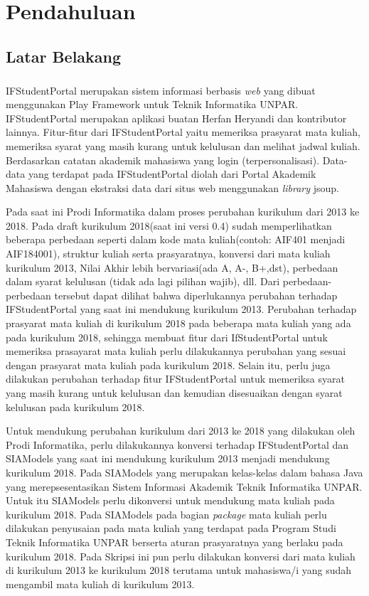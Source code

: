 \chapter{Pendahuluan}
\label{chap:intro}
   
\section{Latar Belakang}
\label{sec:label}

\paragraph{} IFStudentPortal merupakan sistem informasi berbasis  \textit{web} yang dibuat menggunakan Play Framework untuk Teknik Informatika UNPAR. IFStudentPortal merupakan aplikasi buatan Herfan Heryandi dan kontributor lainnya. Fitur-fitur dari IFStudentPortal yaitu memeriksa prasyarat mata kuliah, memeriksa syarat yang masih kurang untuk kelulusan dan melihat jadwal kuliah. Berdasarkan catatan akademik mahasiswa yang login (terpersonalisasi). Data-data yang terdapat pada IFStudentPortal diolah dari Portal Akademik Mahasiswa dengan ekstraksi data dari situs web menggunakan \textit{library} jsoup.

Pada saat ini Prodi Informatika dalam proses perubahan kurikulum dari 2013 ke 2018. Pada draft kurikulum 2018(saat ini versi 0.4) sudah memperlihatkan beberapa perbedaan seperti dalam kode mata kuliah(contoh: AIF401 menjadi AIF184001), struktur kuliah serta prasyaratnya, konversi dari mata kuliah kurikulum 2013, Nilai Akhir lebih bervariasi(ada A, A-, B+,dst), perbedaan dalam syarat kelulusan (tidak ada lagi pilihan wajib), dll. Dari perbedaan-perbedaan tersebut dapat dilihat bahwa diperlukannya perubahan terhadap IFStudentPortal yang saat ini mendukung kurikulum 2013. Perubahan terhadap prasyarat mata kuliah di kurikulum 2018 pada beberapa mata kuliah yang ada pada kurikulum 2018, sehingga membuat fitur dari IfStudentPortal untuk memeriksa prasayarat mata kuliah perlu dilakukannya perubahan yang sesuai dengan prasyarat mata kuliah pada kurikulum 2018. Selain itu, perlu juga dilakukan perubahan terhadap fitur IFStudentPortal untuk memeriksa syarat yang masih kurang untuk kelulusan dan kemudian disesuaikan dengan syarat kelulusan pada kurikulum 2018.

Untuk mendukung perubahan kurikulum dari 2013 ke 2018 yang dilakukan oleh Prodi Informatika, perlu dilakukannya konversi terhadap IFStudentPortal dan SIAModels yang saat ini mendukung kurikulum 2013 menjadi mendukung kurikulum 2018. Pada SIAModels yang merupakan kelas-kelas dalam bahasa Java yang merepsesentasikan Sistem Informasi Akademik Teknik Informatika UNPAR. Untuk itu SIAModels perlu dikonversi untuk mendukung mata kuliah pada kurikulum 2018. Pada SIAModels pada bagian \textit{package} mata kuliah perlu dilakukan penyusaian pada mata kuliah yang terdapat pada Program Studi Teknik Informatika UNPAR berserta aturan prasyaratnya yang berlaku pada kurikulum 2018. Pada Skripsi ini pun perlu dilakukan konversi dari mata kuliah di kurikulum 2013 ke kurikulum 2018 terutama untuk mahasiswa/i yang sudah mengambil mata kuliah di kurikulum 2013.

